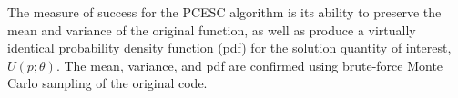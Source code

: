 \documentclass[11pt]{article} %
\begin{document}
The measure of success for the PCESC algorithm is its ability to preserve the mean and variance of the original function, as well as produce a virtually identical probability density function (pdf) for the solution quantity of interest, $U(p;\theta)$.  The mean, variance, and pdf are confirmed using brute-force Monte Carlo sampling of the original code.




\end{document}
